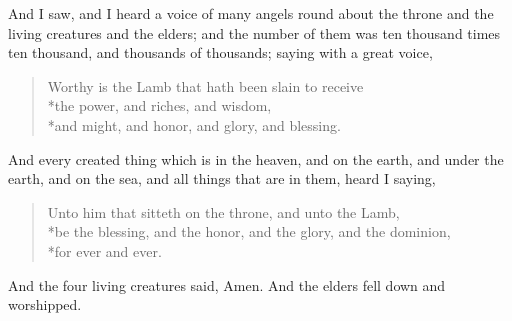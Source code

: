 And I saw, and I heard a voice of many angels round about the throne and the living creatures and the elders; and the number of them was ten thousand times ten thousand, and thousands of thousands;%
saying with a great voice,
\begin{verse}
Worthy is the Lamb that hath been slain to receive\\*\vin the power, and riches, and wisdom,\\*\vin and might, and honor, and glory, and blessing.
\end{verse}
And every created thing which is in the heaven, and on the earth, and under the earth, and on the sea, and all things that are in them, heard I saying,
\begin{verse}
Unto him that sitteth on the throne, and unto the Lamb,\\*\vin be the blessing, and the honor, and the glory, and the dominion,\\*\vin for ever and ever.
\end{verse}
And the four living creatures said, Amen. And the elders fell down and worshipped.
